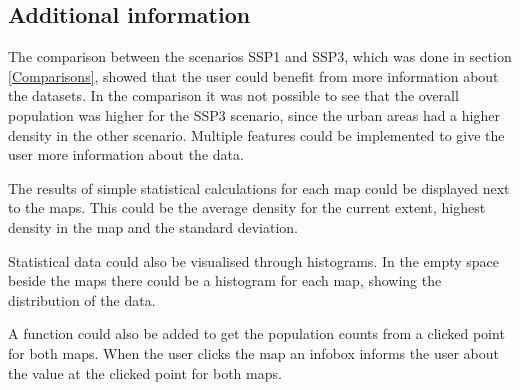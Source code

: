 \subsection{Additional information}\label{MoreInfoPlz}

The comparison between the scenarios SSP1 and SSP3, which was done in section \ref{Comparisons}, showed that the user could benefit from more information about the datasets. In the comparison it was not possible to see that the overall population was higher for the SSP3 scenario, since the urban areas had a higher density in the other scenario. Multiple features could be implemented to give the user more information about the data.

The results of simple statistical calculations for each map could be displayed next to the maps. This could be the average density for the current extent, highest density in the map and the standard deviation.

Statistical data could also be visualised through histograms. In the empty space beside the maps there could be a histogram for each map, showing the distribution of the data. 

A function could also be added to get the population counts from a clicked point for both maps. When the user clicks the map an infobox informs the user about the value at the clicked point for both maps. 

%





